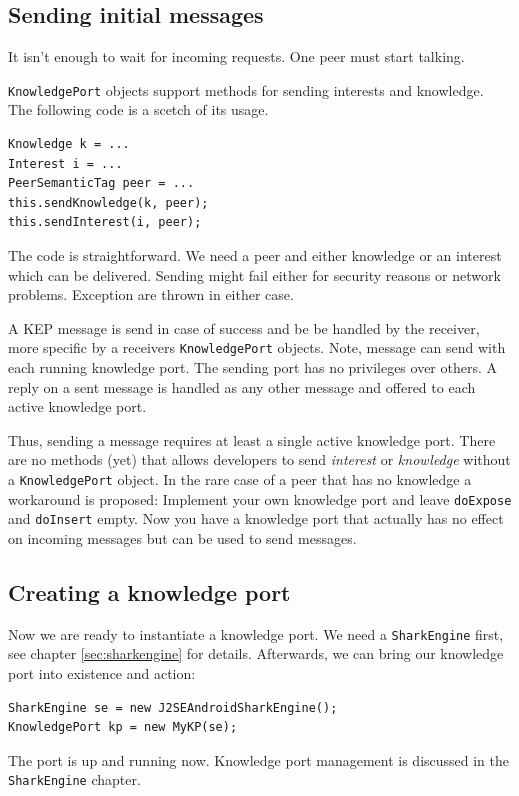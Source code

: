 \subsection{Sending initial messages}
It isn't enough to wait for incoming requests. One peer must start talking.

{\tt KnowledgePort} objects support methods for sending interests and knowledge. The following code is a scetch of its usage.

\begin{verbatim}
Knowledge k = ...
Interest i = ...
PeerSemanticTag peer = ...
this.sendKnowledge(k, peer);
this.sendInterest(i, peer);
\end{verbatim}

The code is straightforward. We need a peer and either knowledge or an interest which can be delivered. Sending might fail either for security reasons or network problems. Exception are thrown in either case.

A KEP message is send in case of success and be be handled by the receiver, more specific by a receivers {\tt KnowledgePort} objects. Note, message can send with each running knowledge port. The sending port has no privileges over others. A reply on a sent message is handled as any other message and offered to each active knowledge port.

Thus, sending a message requires at least a single active knowledge port. 
There are no methods (yet) that allows developers to send {\it interest} or {\it knowledge} without a {\tt KnowledgePort} object. In the rare case of a peer that has no knowledge a workaround is proposed: Implement your own knowledge port and leave {\tt doExpose} and {\tt doInsert} empty. Now you have a knowledge port that actually has no effect on incoming messages but can be used to send messages.

\subsection{Creating a knowledge port}
Now we are ready to instantiate a knowledge port. We need a {\tt SharkEngine} first, see chapter \ref{sec:sharkengine} for details. Afterwards, we can bring our knowledge port into existence and action:

\begin{verbatim}
SharkEngine se = new J2SEAndroidSharkEngine();
KnowledgePort kp = new MyKP(se);
\end{verbatim}

The port is up and running now. Knowledge port management is discussed in the {\tt SharkEngine} chapter.

